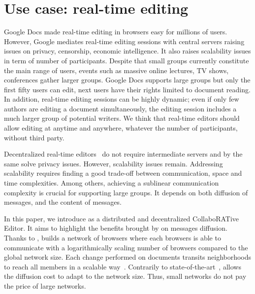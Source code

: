 
\section{Use case: real-time editing}


Google Docs made real-time editing in browsers easy for millions of
users. However, Google mediates real-time editing sessions with central servers
raising issues on privacy, censorship, economic intelligence. It also raises
scalability issues in term of number of participants.  Despite that small groups
currently constitute the main range of users, events such as massive online
lectures, TV shows, conferences gather larger groups.  Google Docs supports
large groups but only the first fifty users can edit, next users have their
rights limited to document reading. In addition, real-time editing sessions can
be highly dynamic; even if only few authors are editing a document
simultaneously, the editing session includes a much larger group of potential
writers. We think that real-time editors should allow editing at anytime and
anywhere, whatever the number of participants, without third party.

Decentralized real-time editors~\cite{oster2006data, sun1998operational,
  sun2009contextbased} do not require intermediate servers and by the same solve
privacy issues. However, scalability issues remain.  Addressing scalability
requires finding a good trade-off between communication, space and time
complexities. Among others, achieving a sublinear communication complexity is
crucial for supporting large groups.  It depends on both diffusion of messages,
and the content of messages.

In this paper, we introduce \CRATE as a distributed and decentralized
CollaboRATive Editor. It aims to highlight the benefits brought by \SPRAY on
messages diffusion. Thanks to \SPRAY, \CRATE builds a network of browsers where
each browsers is able to communicate with a logarithmically scaling number of
browsers compared to the global network size. Each change performed on documents
transits neighborhoods to reach all members in a scalable
way~\cite{birman1999bimodal}. Contrarily to
state-of-the-art~\cite{tolgyeski2009adaptive, voulgaris2005cyclon}, \SPRAY
allows the diffusion cost to adapt to the network size. Thus, small networks do
not pay the price of large networks.

